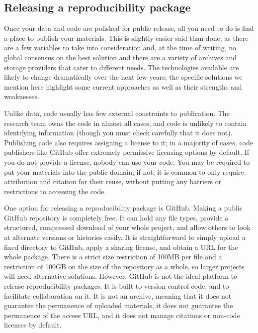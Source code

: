 \subsection{Releasing a reproducibility package}

Once your data and code are polished for public release,
all you need to do is find a place to publish your materials.
This is slightly easier said than done,
as there are a few variables to take into consideration
and, at the time of writing, no global consensus on the best solution
and there are a variety of archives and storage providers
that cater to different needs.
The technologies available are likely to change dramatically
over the next few years;
the specific solutions we mention here highlight some current approaches
as well as their strengths and weaknesses.

Unlike data, code usually has few external constraints to publication.
The research team owns the code in almost all cases,
and code is unlikely to contain identifying information
(though you must check carefully that it does not).
Publishing code also requires assigning a license to it;
in a majority of cases, code publishers like GitHub
offer extremely permissive licensing options by default.
If you do not provide a license, nobody can use your code.
You may be required to put your materials into the public domain;
if not, it is common to only require attribution and citation for their reuse,
without putting any barriers or restrictions to accessing the code.

One option for releasing a reproducibility package is GitHub.
Making a public GitHub repository is completely free.
It can hold any file types,
provide a structured, compressed download of your whole project,
and allow others to look at alternate versions or histories easily.
It is straightforward to simply upload a fixed directory to GitHub,
apply a sharing license, and obtain a URL for the whole package.
There is a strict size restriction of 100MB per file and
a restriction of 100GB on the size of the repository as a whole,
so larger projects will need alternative solutions.
However, GitHub is not the ideal platform to release reproducibility packages.
It is built to version control code, and to facilitate collaboration on it.
It is not an archive, meaning that it does not guarantee the permanence
of uploaded materials, it does not guarantee the permanence of the access URL,
and it does not manage citations or non-code licenses by default.

